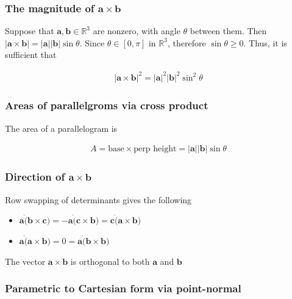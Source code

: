 \documentclass{report}
\renewcommand{\vec}{\mathbf}
\begin{document}
		\subsubsection{The magnitude of $\vec{a} \times \vec{b}$}

			Suppose that $\vec{a}, \vec{b} \in \mathbb{R}^3$ are nonzero, with angle $\theta$ between them. Then $|\vec{a} \times \vec{b}| = |\vec{a}||\vec{b}| \sin \theta$. Since $\theta \in [0, \pi]$ in $\mathbb{R}^3$, therefore $\sin \theta \geq 0$. Thus, it is sufficient that
			
				\begin{align*}
					|\vec{a} \times \vec{b}|^2 = |\vec{a}|^2 |\vec{b}|^2 \sin^2 \theta
				\end{align*}

		\subsubsection{Areas of parallelgroms via cross product}

			The area of a parallelogram is

				\begin{align*}
					A = \text{base} \times \text{perp height} = |\vec{a}||\vec{b}| \sin \theta
				\end{align*}

		\subsubsection{Direction of $\vec{a} \times \vec{b}$}

			Row swapping of determinants gives the following

			\begin{itemize}
				\item $\vec{a} \dot (\vec{b} \times \vec{c}) = - \vec{a} \dot (\vec{c} \times \vec{b}) = \vec{c} \dot (\vec{a} \times \vec{b})$
				\item $\vec{a} \dot (\vec{a} \times \vec{b}) = 0 = \vec{a} \dot (\vec{b} \times \vec{b})$
			\end{itemize}

			The vector $\vec{a} \times \vec{b}$ is orthogonal to both $\vec{a}$ and $\vec{b}$

		\subsubsection{Parametric to Cartesian form via point-normal}
\end{document}
